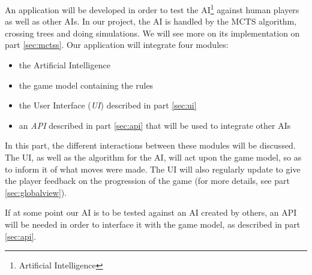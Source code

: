 An application will be developed in order to test the AI\footnote{Artificial Intelligence} against human players as well as other AIs.
In our project, the AI is handled by the MCTS algorithm, crossing trees and doing simulations. We will see more on its implementation on part \ref{sec:mctss}.
Our application will integrate four modules: 
\begin{itemize}[nolistsep]
\item the Artificial Intelligence
\item the game model containing the rules
\item the User Interface (\emph{UI}) described in part \ref{sec:ui}
\item an \emph{API} described in part \ref{sec:api} that will be used to integrate other AIs
\end{itemize}

In this part, the different interactions between these modules will be discussed.
The UI, as well as the algorithm for the AI, will act upon the game model, so as to inform it of what moves were made.
The UI will also regularly update to give the player feedback on the progression of the game (for more details, see part \ref{sec:globalview}).

If at some point our AI is to be tested against an AI created by others, an API will be needed in order to interface it with the game model, as described in part \ref{sec:api}.
